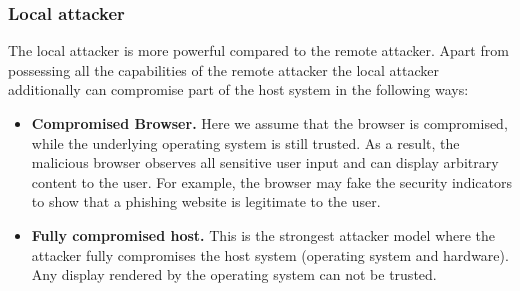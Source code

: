\subsubsection{Local attacker}

The local attacker is more powerful compared to the remote attacker. Apart from
possessing all the capabilities of the remote attacker the local attacker
additionally can compromise part of the host system in the following ways:

\begin{itemize}
  \item \textbf{Compromised Browser.}
Here we assume that the browser is compromised, while the underlying operating
system is still trusted. As a result, the malicious browser observes all
sensitive user input and can display arbitrary content to the user. For example,
the browser may fake the security indicators to show that a phishing website is
legitimate to the user.

\item \textbf{Fully compromised host.}
This is the strongest attacker model where the attacker fully compromises the
host system (operating system and hardware). Any display rendered by the
operating system can not be trusted.
\end{itemize}

